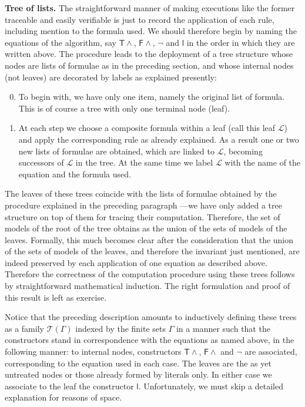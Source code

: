 \documentclass[a4paper,UKenglish]{lipics}
\newcounter{c}
\newcommand{\nentry}[1]{\noindent\textbf{#1}}
\newcommand{\ruleq}[1]{\ensuremath{\mathsf{#1}}}
\newcommand{\ttabl}[1]{\ensuremath{\mathcal{T}({#1})}}
\begin{document}
\nentry{Tree of lists.} The straightforward manner of making executions like the former traceable and easily verifiable is just to record the application of each rule, including mention to the formula used. We should therefore begin by naming the equations of the algorithm, say \ruleq{T\wedge}, \ruleq{F\wedge}, \ruleq{\neg} and \ruleq{l} in the order in which they are written above.
\noindent The procedure leads to the deployment of a tree structure whose nodes are lists of formulae as in the preceding section, and whose internal nodes (not leaves) are decorated by labels as explained presently: \begin{enumerate}  \setcounter{enumi}{-1}
\item To begin with, we have only one item, namely the original list of formula. This is of course a tree with only one terminal node (leaf).
\item At each step we choose a composite formula within a leaf (call this leaf $\mathcal{L}$) and apply the corresponding rule as already explained. As a result one or two new lists of formulae are obtained, which are linked to $\mathcal{L}$, becoming successors of $\mathcal{L}$ in the tree. At the same time we label $\mathcal{L}$ with the name of the equation and the formula used.
\end{enumerate}
The leaves of these trees coincide with the lists of formulae obtained by the procedure explained in the preceding paragraph ---we have only added a tree structure on top of them for tracing their computation. Therefore, the set of models of the root of the tree obtains as the union of the sets of models of the leaves. Formally, this much becomes clear after the consideration that the union of the sets of models of the leaves, and therefore the invariant just mentioned, are indeed preserved by each application of one equation as described above. Therefore the correctness of the
computation procedure using these trees follows by straightforward mathematical induction. The right formulation and proof of this result is left as exercise.

Notice that the preceding description amounts to inductively defining these trees as a family \ttabl{\Gamma} indexed by the finite sets $\Gamma$ in a manner such that the constructors stand in correspondence with the equations as named above, in the following manner: to internal nodes, constructors \ruleq{T\wedge}, \ruleq{F\wedge} and \ruleq{\neg} 
are associated, corresponding to the equation used in each case. The leaves are the as yet untreated nodes or those already formed by literals only. In either case we associate to the leaf the constructor \ruleq{l}. Unfortunately, we must skip a detailed explanation for reasons of space.
\end{document}
